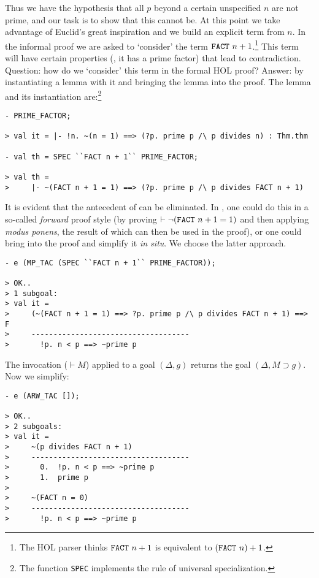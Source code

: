 Thus we have the hypothesis that all $p$ beyond a certain unspecified
$n$ are not prime, and our task is to show that this cannot be. At this
point we take advantage of Euclid's great inspiration and we build an
explicit term from $n$. In the informal proof we are asked to `consider'
the term $\mbox{\tt FACT}\ n + 1$.\footnote{The HOL parser thinks
$\mbox{\tt FACT}\ n + 1$ is equivalent to $(\mbox{\tt FACT}\ n) + 1$.}
This term will have certain properties (\ie, it has a prime factor) that
lead to contradiction. Question: how do we `consider' this term in the
formal HOL proof? Answer: by instantiating a lemma with it and bringing the
lemma into the proof. The lemma and its instantiation are:\footnote{The
function {\tt SPEC} implements the rule of universal specialization.}
\begin{session}\begin{verbatim}
- PRIME_FACTOR;

> val it = |- !n. ~(n = 1) ==> (?p. prime p /\ p divides n) : Thm.thm

- val th = SPEC ``FACT n + 1`` PRIME_FACTOR;

> val th =
>     |- ~(FACT n + 1 = 1) ==> (?p. prime p /\ p divides FACT n + 1)
\end{verbatim}\end{session}
It is evident that the antecedent of  can be eliminated. In
\holn{}, one could do this in a so-called {\it forward\/} proof style (by
proving $\vdash \neg(\mbox{\tt FACT}\ n + 1 = 1)$ and then applying {\it
modus ponens}, the result of which can then be used in the proof), or
one could bring  into the proof and simplify it {\it in
situ}. We choose the latter approach.
\begin{session}\begin{verbatim}
- e (MP_TAC (SPEC ``FACT n + 1`` PRIME_FACTOR));

> OK..
> 1 subgoal:
> val it =
>     (~(FACT n + 1 = 1) ==> ?p. prime p /\ p divides FACT n + 1) ==> F
>     ------------------------------------
>       !p. n < p ==> ~prime p
\end{verbatim}\end{session}
    The invocation  ($\vdash M$) applied to a goal
    $(\Delta, g)$ returns the goal $(\Delta, M \supset g)$. Now we
    simplify:
\begin{session}\begin{verbatim}
- e (ARW_TAC []);

> OK..
> 2 subgoals:
> val it =
>     ~(p divides FACT n + 1)
>     ------------------------------------
>       0.  !p. n < p ==> ~prime p
>       1.  prime p
>
>     ~(FACT n = 0)
>     ------------------------------------
>       !p. n < p ==> ~prime p
\end{verbatim}\end{session}
